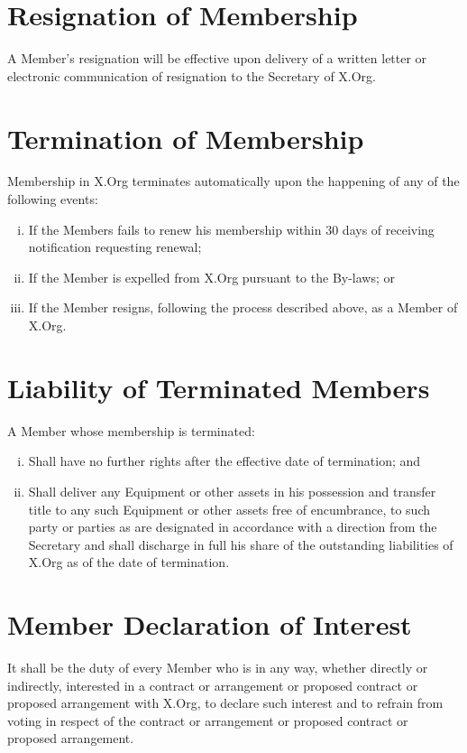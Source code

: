 \documentclass[10pt, english]{bylaws}
\begin{document}
\section{Resignation of Membership}
A Member's resignation will be effective upon delivery of a written letter or
electronic communication of resignation to the Secretary of X.Org.

\section{Termination of Membership}
Membership in X.Org terminates automatically upon the happening of any of the
following events:

\begin{enumerate}[(i)\hspace{.2cm}]
	\item If the Members fails to renew his membership within 30 days of
	receiving notification requesting renewal;

	\item If the Member is expelled from X.Org pursuant to the By-laws; or

	\item If the Member resigns, following the process described above, as a
	Member of X.Org.
\end{enumerate}

\section{Liability of Terminated Members}
A Member whose membership is terminated:

\begin{enumerate}[(i)\hspace{.2cm}]
	\item Shall have no further rights after the effective date of
	termination; and

	\item Shall deliver any Equipment or other assets in his possession and
	transfer title to any such Equipment or other assets free of
	encumbrance, to such party or parties as are designated in accordance
	with a direction from the Secretary and shall discharge in full his
	share of the outstanding liabilities of X.Org as of the date of
	termination.
\end{enumerate}

\section{Member Declaration of Interest}
It shall be the duty of every Member who is in any way, whether directly or
indirectly, interested in a contract or arrangement or proposed contract or
proposed arrangement with X.Org, to declare such interest and to refrain from
voting in respect of the contract or arrangement or proposed contract or
proposed arrangement.
\end{document}
